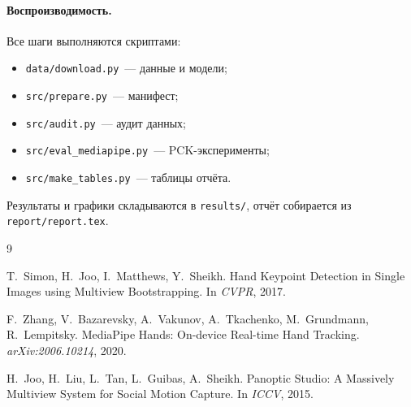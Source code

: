 \documentclass[11pt,a4paper]{article}
\begin{document}
\paragraph{Воспроизводимость.} Все шаги выполняются скриптами:
\begin{itemize}
  \item \texttt{data/download.py}~--- данные и модели;
  \item \texttt{src/prepare.py}~--- манифест;
  \item \texttt{src/audit.py}~--- аудит данных;
  \item \texttt{src/eval\_mediapipe.py}~--- PCK-эксперименты;
  \item \texttt{src/make\_tables.py}~--- таблицы отчёта.
\end{itemize}
Результаты и графики складываются в \texttt{results/}, отчёт собирается из
\texttt{report/report.tex}.

\clearpage
\begin{thebibliography}{9}

T.~Simon, H.~Joo, I.~Matthews, Y.~Sheikh.
\newblock Hand Keypoint Detection in Single Images using Multiview Bootstrapping.
\newblock In \emph{CVPR}, 2017.

F.~Zhang, V.~Bazarevsky, A.~Vakunov, A.~Tkachenko, M.~Grundmann, R.~Lempitsky.
\newblock MediaPipe Hands: On-device Real-time Hand Tracking.
\newblock \emph{arXiv:2006.10214}, 2020.

H.~Joo, H.~Liu, L.~Tan, L.~Guibas, A.~Sheikh.
\newblock Panoptic Studio: A Massively Multiview System for Social Motion Capture.
\newblock In \emph{ICCV}, 2015.

\end{thebibliography}
\end{document}
